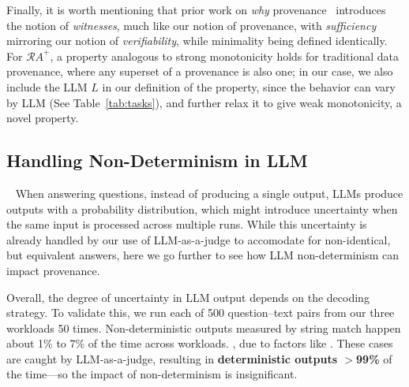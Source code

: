 Finally, it is worth mentioning that prior work on {\em why} provenance~\cite{buneman2001and,cui2000tracing}
introduces the notion of {\em witnesses}, much like our notion of
provenance, with {\em sufficiency} mirroring our notion of  
{\em verifiability}, while minimality being defined identically.
For ${\mathcal RA}^+$, a property analogous to strong monotonicity holds
for traditional data provenance, where any superset of a provenance is also one;
in our case, we also include the LLM $L$ in our 
definition of the property, since
the behavior can vary by LLM (See Table~\ref{tab:tasks}),
and further relax it to give weak monotonicity, a novel property.
\fi

\vspace{-4mm}
\subsection{Handling Non-Determinism in LLM}~\label{subsec:llm-uncertainty}
When answering questions, instead of producing a single output,  
LLMs produce  
outputs with a probability distribution, which might introduce uncertainty when the same input is processed across multiple runs. While this uncertainty is already handled by our use of LLM-as-a-judge to accomodate for non-identical, but equivalent answers, 
here we go further to see how LLM non-determinism can impact provenance. 

Overall, the degree of uncertainty in LLM output depends on the decoding strategy. 
To validate this, we run each of 500 question–text pairs from our three workloads 50 times. 
Non-deterministic outputs measured by string match happen about 1\% to 7\% of the time across workloads. 
, due to factors like . These cases are 
caught by LLM-as-a-judge, resulting in {\bf deterministic outputs $>$99\%} of the time---so the impact of non-determinism is insignificant. 

